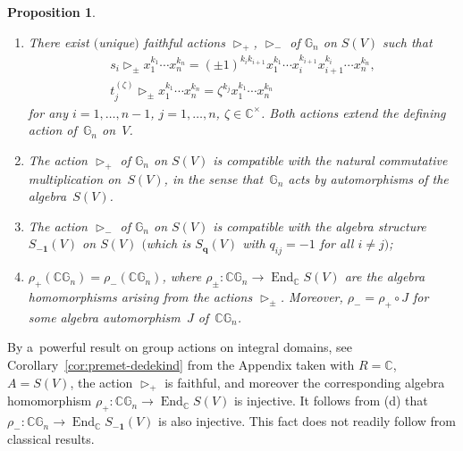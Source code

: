 \documentclass[pdftex]{sigma}
\DeclareMathOperator{\End}{End}
\newtheorem{Proposition}[Theorem]{Proposition}
\begin{document}
\begin{Proposition}\label{prop:automorphism}\quad
\begin{enumerate}\itemsep=0pt
\item[$(a)$] There exist $($unique$)$ faithful actions $\mathop{\triangleright}\nolimits_+$, $\mathop{\triangleright}\nolimits_-$ of
$\mathbb G_n$ on $S(V)$ such that
\begin{gather*}
s_i \mathop{\triangleright}\nolimits_\pm x_1^{k_1}\cdots x_n^{k_n} = (\pm 1)^{k_ik_{i+1}} x_1^{k_1}\cdots
x_i^{k_{i+1}}x_{i+1}^{k_i}\cdots x_n^{k_n},
\\
t_j^{(\zeta)}\mathop{\triangleright}\nolimits_\pm x_1^{k_1}\cdots x_n^{k_n} = \zeta^{k_j} x_1^{k_1}\cdots
x_n^{k_n}
\end{gather*}
for any $i=1,\ldots,n-1$, $j=1,\ldots,n$, $\zeta\in \mathbb C^\times$.
Both actions extend the defining action of~$\mathbb G_n$ on~$V$.

\item[$(b)$] The action $\mathop{\triangleright}\nolimits_+$ of $\mathbb G_n$ on $S(V)$ is compatible with the natural
commutative multiplication on~$S(V)$, in the sense that~$\mathbb G_n$ acts by automorphisms of the algebra~$S(V)$.

\item[$(c)$] The action $\mathop{\triangleright}\nolimits_-$ of $\mathbb G_n$ on $S(V)$ is compatible    with the
algebra structure $S_{\mathbf{-1}}(V)$ on $S(V)$ $($which is $S_{\mathbf q}(V)$ with $q_{ij}=-1$ for all $i\ne j)$;

\item[$(d)$] $\rho_+(\mathbb C \mathbb G_n)= \rho_-(\mathbb C \mathbb G_n)$, where $\rho_\pm\colon \mathbb C\mathbb G_n \to
\End_\mathbb C S(V)$ are the algebra homomorphisms arising from the actions $\mathop{\triangleright}\nolimits_\pm$.
Moreover, $\rho_-=\rho_+ \circ J$ for some algebra automorphism~$J$ of~$\mathbb C \mathbb G_n$.
\end{enumerate}
\end{Proposition}

\begin{Remark}
\label{rem:injectivity}
By a~powerful result on group actions on integral domains, see Corollary~\ref{cor:premet-dedekind} from the
Appendix taken with $R=\mathbb C$, $A=S(V)$, the action $\mathop{\triangleright}\nolimits_+$ is faithful, and
moreover the corresponding algebra homomorphism $\rho_+\colon \mathbb C \mathbb G_n \to \End_\mathbb C S(V)$ is
injective.
It follows from (d) that $\rho_-\colon \mathbb C \mathbb G_n\to \End_\mathbb C S_{\mathbf{-1}}(V)$ is also injective.
This fact does not readily follow from classical results.
\end{Remark}
\end{document}
